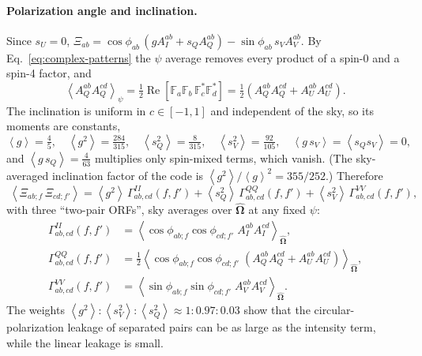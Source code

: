 \documentclass[11pt]{article}
\newcommand{\avg}[1]{\left\langle #1 \right\rangle}
\renewcommand{\Re}{\operatorname{Re}}
\newcommand{\bOmega}{\hat{\bm{\Omega}}}
\theoremstyle{remark}
\begin{document}
\paragraph{Polarization angle and inclination.}
Since $s_U = 0$,
$\Xi_{ab} = \cos\phi_{ab}\,(g A_I^{ab} + s_Q A_Q^{ab}) - \sin\phi_{ab}\, s_V A_V^{ab}$.
By Eq.~\eqref{eq:complex-patterns} the $\psi$ average removes every product of a
spin-0 and a spin-4 factor, and
\begin{equation}
  \avg{A_Q^{ab} A_Q^{cd}}_\psi
  = \tfrac12 \Re\!\left[\mathbb F_a \mathbb F_b\, \mathbb F_c^* \mathbb F_d^*\right]
  = \tfrac12\left(A_Q^{ab}A_Q^{cd} + A_U^{ab}A_U^{cd}\right).
\end{equation}
The inclination is uniform in $c \in [-1,1]$ and independent of the sky, so its
moments are constants,
\begin{equation}
  \avg{g} = \tfrac45, \quad
  \avg{g^2} = \tfrac{284}{315}, \quad
  \avg{s_Q^2} = \tfrac{8}{315}, \quad
  \avg{s_V^2} = \tfrac{92}{105}, \quad
  \avg{g\, s_V} = \avg{s_Q s_V} = 0 ,
\end{equation}
and $\avg{g\,s_Q} = \tfrac{4}{63}$ multiplies only spin-mixed terms, which vanish.
(The sky-averaged inclination factor of the code is
$\avg{g^2}/\avg{g}^2 = 355/252$.) Therefore
\begin{equation}
  \boxed{\;
  \avg{\Xi_{ab;f}\,\Xi_{cd;f'}}
  = \avg{g^2}\, \Gamma^{II}_{ab,cd}(f,f')
  + \avg{s_Q^2}\, \Gamma^{QQ}_{ab,cd}(f,f')
  + \avg{s_V^2}\, \Gamma^{VV}_{ab,cd}(f,f') ,
  \;}
  \label{eq:three-terms}
\end{equation}
with three ``two-pair ORFs'', sky averages over $\bOmega$ at any fixed $\psi$:
\begin{align}
  \Gamma^{II}_{ab,cd}(f,f') &= \avg{\cos\phi_{ab;f}\cos\phi_{cd;f'}\;
      A_I^{ab} A_I^{cd}}_{\bOmega}, \\
  \Gamma^{QQ}_{ab,cd}(f,f') &= \tfrac12\avg{\cos\phi_{ab;f}\cos\phi_{cd;f'}\;
      \left(A_Q^{ab}A_Q^{cd} + A_U^{ab}A_U^{cd}\right)}_{\bOmega}, \\
  \Gamma^{VV}_{ab,cd}(f,f') &= \avg{\sin\phi_{ab;f}\sin\phi_{cd;f'}\;
      A_V^{ab} A_V^{cd}}_{\bOmega}.
\end{align}
The weights $\avg{g^2} : \avg{s_V^2} : \avg{s_Q^2} \approx 1 : 0.97 : 0.03$
show that the circular-polarization leakage of separated pairs can be as large as
the intensity term, while the linear leakage is small.
\end{document}
